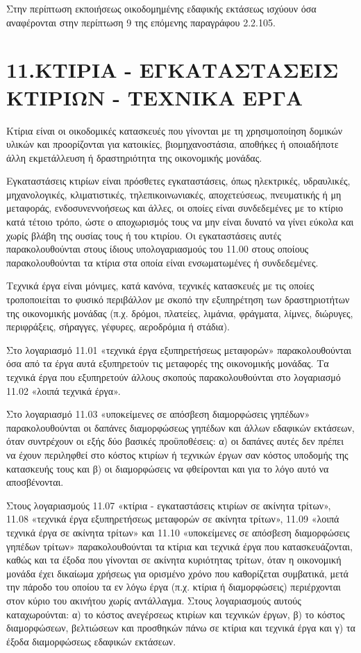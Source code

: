 \documentclass[A4,10pt,greek]{book}
\begin{document}
Στην περίπτωση εκποιήσεως οικοδομημένης εδαφικής εκτάσεως ισχύουν όσα αναφέρονται στην περίπτωση 9 της επόμενης παραγράφου 2.2.105.

\section{11.ΚΤΙΡΙΑ - ΕΓΚΑΤΑΣΤΑΣΕΙΣ ΚΤΙΡΙΩΝ - ΤΕΧΝΙΚΑ ΕΡΓΑ}

Κτίρια είναι οι οικοδομικές κατασκευές που γίνονται με τη χρησιμοποίηση δομικών υλικών και προορίζονται για κατοικίες, βιομηχανοστάσια, αποθήκες ή οποιαδήποτε άλλη εκμετάλλευση ή δραστηριότητα της οικονομικής μονάδας.

Εγκαταστάσεις κτιρίων είναι πρόσθετες εγκαταστάσεις, όπως ηλεκτρικές, υδραυλικές, μηχανολογικές, κλιματιστικές, τηλεπικοινωνιακές, αποχετεύσεως, πνευματικής ή μη μεταφοράς, ενδοσυνεννοήσεως και άλλες, οι οποίες είναι συνδεδεμένες με το κτίριο κατά τέτοιο τρόπο, ώστε ο αποχωρισμός τους να μην είναι δυνατό να γίνει εύκολα και χωρίς βλάβη της ουσίας τους ή του κτιρίου. Οι εγκαταστάσεις αυτές παρακολουθούνται στους ίδιους υπολογαριασμούς του 11.00 στους οποίους παρακολουθούνται τα κτίρια στα οποία είναι ενσωματωμένες ή συνδεδεμένες.

Τεχνικά έργα είναι μόνιμες, κατά κανόνα, τεχνικές κατασκευές με τις οποίες τροποποιείται το φυσικό περιβάλλον με σκοπό την εξυπηρέτηση των δραστηριοτήτων της οικονομικής μονάδας (π.χ. δρόμοι, πλατείες, λιμάνια, φράγματα, λίμνες, διώρυγες, περιφράξεις, σήραγγες, γέφυρες, αεροδρόμια ή στάδια).

Στο λογαριασμό 11.01 «τεχνικά έργα εξυπηρετήσεως μεταφορών» παρακολουθούνται όσα από τα έργα αυτά εξυπηρετούν τις μεταφορές της οικονομικής μονάδας. Τα τεχνικά έργα που εξυπηρετούν άλλους σκοπούς παρακολουθούνται στο λογαριασμό 11.02 «λοιπά τεχνικά έργα».

Στο λογαριασμό 11.03 «υποκείμενες σε απόσβεση διαμορφώσεις γηπέδων» παρακολουθούνται οι δαπάνες διαμορφώσεως γηπέδων και άλλων εδαφικών εκτάσεων, όταν συντρέχουν οι εξής δύο βασικές προϋποθέσεις: α) οι δαπάνες αυτές δεν πρέπει να έχουν περιληφθεί στο κόστος κτιρίων ή τεχνικών έργων σαν κόστος υποδομής της κατασκευής τους και β) οι διαμορφώσεις να φθείρονται και για το λόγο αυτό να αποσβένονται.

Στους λογαριασμούς 11.07 «κτίρια - εγκαταστάσεις κτιρίων σε ακίνητα τρίτων», 11.08 «τεχνικά έργα εξυπηρετήσεως μεταφορών σε ακίνητα τρίτων», 11.09 «λοιπά τεχνικά έργα σε ακίνητα τρίτων» και 11.10 «υποκείμενες σε απόσβεση διαμορφώσεις γηπέδων τρίτων» παρακολουθούνται τα κτίρια και τεχνικά έργα που κατασκευάζονται, καθώς και τα έξοδα που γίνονται σε ακίνητα κυριότητας τρίτων, όταν η οικονομική μονάδα έχει δικαίωμα χρήσεως για ορισμένο χρόνο που καθορίζεται συμβατικά, μετά την πάροδο του οποίου τα εν λόγω έργα (π.χ. κτίρια ή διαμορφώσεις) περιέρχονται στον κύριο του ακινήτου χωρίς αντάλλαγμα. Στους λογαριασμούς αυτούς καταχωρούνται: α) το κόστος ανεγέρσεως κτιρίων και τεχνικών έργων, β) το κόστος διαμορφώσεων, βελτιώσεων και προσθηκών πάνω σε κτίρια και τεχνικά έργα και γ) τα έξοδα διαμορφώσεως εδαφικών εκτάσεων.
\end{document}
